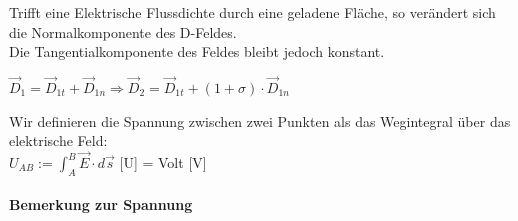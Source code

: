 \beginip
Trifft eine Elektrische Flussdichte durch eine geladene Fläche, so verändert sich die Normalkomponente des D-Feldes. \\
Die Tangentialkomponente des Feldes bleibt jedoch konstant. \\
 \begin{center}
\end{center}
\formulaBegin
$\vec{D}_1 = \vec{D}_{1t} + \vec{D}_{1n} \Rightarrow \vec{D}_2 = \vec{D}_{1t} + (1 + \sigma) \cdot \vec{D}_{1n}$
\formulaEnd
\iend


\beginip
Wir definieren die Spannung zwischen zwei Punkten als das Wegintegral über das elektrische Feld: \\
\formulaBegin
$ U_{AB} :=  \int_A^B \vec{E} \cdot d\vec{s} $
\formulaEnd
{[U]} = Volt {[V]}
\iend

\paragraph{Bemerkung zur Spannung}

